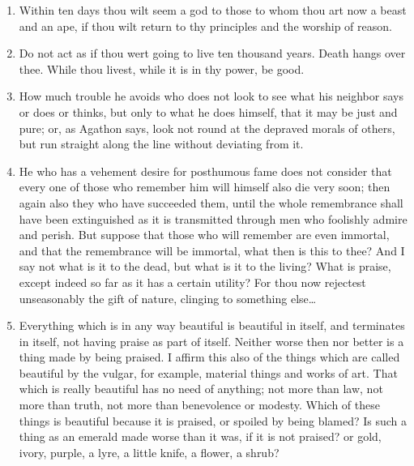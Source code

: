 \begin{enumerate}
\item Within ten days thou wilt seem a god to those to whom thou art now a beast and an ape, if thou wilt return to thy principles and the worship of reason.

\item Do not act as if thou wert going to live ten thousand years. Death hangs over thee. While thou livest, while it is in thy power, be good.

\item How much trouble he avoids who does not look to see what his neighbor says or does or thinks, but only to what he does himself, that it may be just and pure; or, as Agathon says, look not round at the depraved morals of others, but run straight along the line without deviating from it.

\item He who has a vehement desire for posthumous fame does not consider that every one of those who remember him will himself also die very soon; then again also they who have succeeded them, until the whole remembrance shall have been extinguished as it is transmitted through men who foolishly admire and perish. But suppose that those who will remember are even immortal, and that the remembrance will be immortal, what then is this to thee? And I say not what is it to the dead, but what is it to the living? What is praise, except indeed so far as it has a certain utility? For thou now rejectest unseasonably the gift of nature, clinging to something else\ldots

\item Everything which is in any way beautiful is beautiful in itself, and terminates in itself, not having praise as part of itself. Neither worse then nor better is a thing made by being praised. I affirm this also of the things which are called beautiful by the vulgar, for example, material things and works of art. That which is really beautiful has no need of anything; not more than law, not more than truth, not more than benevolence or modesty. Which of these things is beautiful because it is praised, or spoiled by being blamed? Is such a thing as an emerald made worse than it was, if it is not praised? or gold, ivory, purple, a lyre, a little knife, a flower, a shrub?


\end{enumerate}
